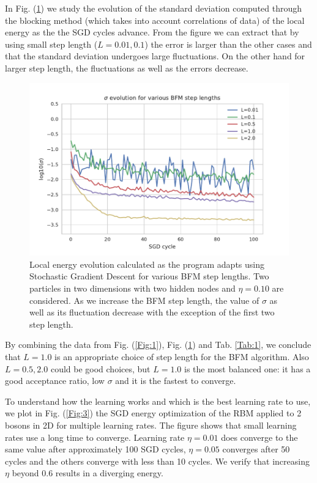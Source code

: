 In Fig. (\ref{Fig:2}) we study the evolution of the standard deviation computed through the blocking method (which takes into account correlations of data) of the local energy as the the SGD cycles advance. From the figure we can extract that by using small step length ($L=0.01,0.1$) the error is larger than the other cases and that the standard deviation undergoes large fluctuations. On the other hand for larger step length, the fluctuations as well as the errors decrease.

\begin{figure}[H]
	\centering
	\includegraphics[scale=1.00]{plot2.pdf}
	\caption{Local energy evolution calculated as the program adapts using Stochastic Gradient Descent for various BFM step lengths. Two particles in two dimensions with two hidden nodes and $\eta = 0.10$ are considered. As we increase the BFM step length, the value of $\sigma$ as well as its fluctuation decrease with the exception of the first two step length.}
	\label{Fig:2}
\end{figure} 

By combining the data from Fig. (\ref{Fig:1}), Fig. (\ref{Fig:2}) and Tab. \ref{Tab:1}, we conclude that $L = 1.0$ is an appropriate choice of step length for the BFM algorithm. Also $L=0.5,2.0$ could be good choices, but $L=1.0$ is the most balanced one: it has a good acceptance ratio, low $\sigma$ and it is the fastest to converge.

To understand how the learning works and which is the best learning rate to use, we plot in Fig. (\ref{Fig:3}) the SGD energy optimization of the RBM applied to 2 bosons in 2D for multiple learning rates. The figure shows that small learning rates use a long time to converge. Learning rate $\eta=0.01$ does converge to the same value after approximately 100 SGD cycles, $\eta=0.05$ converges after 50 cycles and the others converge with less than 10 cycles. We verify that increasing $\eta$ beyond 0.6 results in a diverging energy. 

